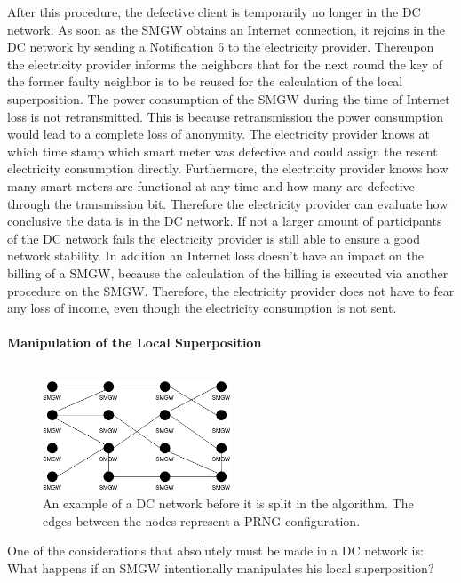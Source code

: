 After this procedure, the defective client is temporarily no longer in the DC network. As soon as the SMGW obtains an Internet connection, it rejoins in the DC network by sending a Notification 6 to the electricity provider. Thereupon the electricity provider informs the neighbors that for the next round the key of the former faulty neighbor is to be reused for the calculation of the local superposition. The power consumption of the SMGW during the time of Internet loss is not retransmitted. This is because retransmission the power consumption would lead to a complete loss of anonymity. The electricity provider knows at which time stamp which smart meter was defective and could assign the resent electricity consumption directly. Furthermore, the electricity provider knows how many smart meters are functional at any time and how many are defective through the transmission bit. Therefore the electricity provider can evaluate how conclusive the data is in the DC network. %
If not a larger amount of participants of the DC network fails the electricity provider is still able to ensure a good network stability. %
In addition an Internet loss doesn't have an impact on the billing of a SMGW, because the calculation of the billing is executed via another procedure on the SMGW. Therefore, the electricity provider does not have to fear any loss of income, even though the electricity consumption is not sent.\\
\\ 
\textbf{Manipulation of the Local Superposition}
\label{subsec:mani_local}
\\
\\
\begin{figure}[tbp]
  \centering
  \includegraphics[width=0.5\textwidth]{images/DC Net before Split.png}
  \caption[Example DC Network]{An example of a DC network before it is split in the algorithm. The edges between the nodes represent a PRNG configuration.}
  \label{fig:splitDCNetwork}
\end{figure}One of the considerations that absolutely must be made in a DC network is: What happens if an SMGW intentionally manipulates his local superposition?
